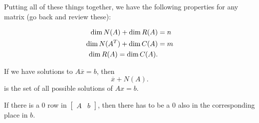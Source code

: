 Putting all of these things together, we have the following properties for any matrix (go back and review these):

\begin{prop}
	\begin{align*}
		\operatorname{dim} N(A) + \operatorname{dim} R(A) &= n \\
		\operatorname{dim} N(A^{T}) + \operatorname{dim} C(A) &=  m \\
		\operatorname{dim} R(A) = \operatorname{dim} C(A)
	.\end{align*}
\end{prop}

If we have solutions to \( A \overline{x}=b \), then \[
	\overline{x} + N(A)
.\] is the set of all possible solutions of \( Ax=b \).

If there is a 0 row in \( \begin{bmatrix}
	A& b
\end{bmatrix} \), then there has to be a 0 also in the corresponding place in \( b \).

